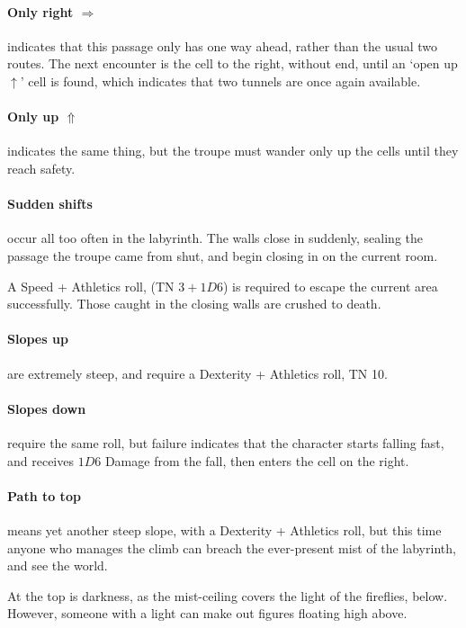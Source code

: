 \begin{multicols}{2}
\paragraph{Only right $\Rightarrow$}
indicates that this passage only has one way ahead, rather than the usual two routes.
The next encounter is the cell to the right, without end, until an `open up $\uparrow$' cell is found,  which indicates that two tunnels are once again available.

\paragraph{Only up $\Uparrow$}
indicates the same thing, but the troupe must wander only up the cells until they reach safety.

\paragraph{Sudden shifts}
occur all too often in the labyrinth.
The walls close in suddenly, sealing the passage the troupe came from shut, and begin closing in on the current room.

A Speed + Athletics roll, (TN $3 + 1D6$)
is required to escape the current area successfully.
Those caught in the closing walls are crushed to death.

\paragraph{Slopes up}
are extremely steep, and require a Dexterity + Athletics roll, TN 10.

\paragraph{Slopes down}
require the same roll, but failure indicates that the character starts falling fast, and receives $1D6$ Damage from the fall, then enters the cell on the right.

\paragraph{Path to top}
means yet another steep slope, with a Dexterity + Athletics roll, but this time anyone who manages the climb can breach the ever-present mist of the labyrinth, and see the world.

At the top is darkness, as the mist-ceiling covers the light of the fireflies, below.
However, someone with a light can make out figures floating high above.

\end{multicols}

